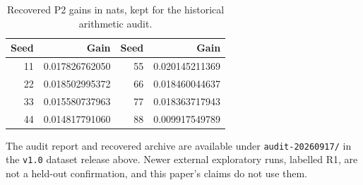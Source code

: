 \documentclass[11pt]{article}
\begin{document}
\begin{table}[H]
\centering\small
\begin{tabular}{rrrr}
\toprule
Seed & Gain & Seed & Gain \\
\midrule
11 & 0.017826762050 & 55 & 0.020145211369 \\
22 & 0.018502995372 & 66 & 0.018460044637 \\
33 & 0.015580737963 & 77 & 0.018363717943 \\
44 & 0.014817791060 & 88 & 0.009917549789 \\
\bottomrule
\end{tabular}
\caption{Recovered P2 gains in nats, kept for the historical arithmetic audit.}
\label{tab:p2history}
\end{table}

The audit report and recovered archive are available under \nolinkurl{audit-20260917/} in the \texttt{v1.0} dataset release above. Newer external exploratory runs, labelled R1, are not a held-out confirmation, and this paper's claims do not use them.

\begingroup
\small


\endgroup
\end{document}
